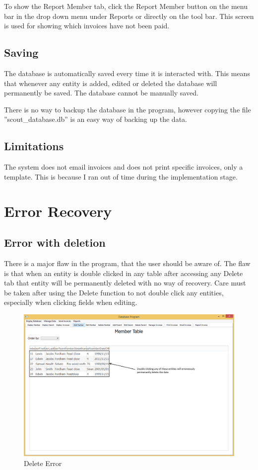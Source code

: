 To show the Report Member tab, click the Report Member button on the menu bar in the drop down menu under Reports or directly on the tool bar. This screen is used for showing which invoices have not been paid.


\subsection{Saving}
The database is automatically saved every time it is interacted with. This means that whenever any entity is added, edited or deleted the database will permanently be saved. The database cannot be manually saved.

There is no way to backup the database in the program, however copying the file ''scout\_database.db'' is an easy way of backing up the data.

 
\subsection{Limitations}
The system does not email invoices and does not print specific invoices, only a template. This is because I ran out of time during the implementation stage.


\section{Error Recovery}

\subsection{Error with deletion}
There is a major flaw in the program, that the user should be aware of. The flaw is that when an entity is double clicked in any table after accessing any Delete tab that entity will be permanently deleted with no way of recovery. Care must be taken after using the Delete function to not double click any entities, especially when clicking fields when editing.

\begin{figure}[H]
\includegraphics[width=\textwidth]{./Manual/Images/DeleteError.png}
    \caption{Delete Error} \label{fig:delete_error}
\end{figure}

